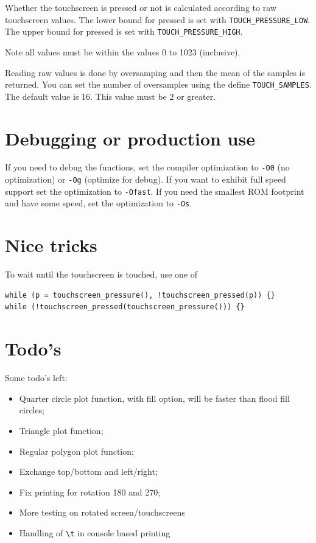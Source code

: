 \documentclass[12pt]{article}
\begin{document}
Whether the touchscreen is pressed or not is calculated according to raw touchscreen values. The lower bound for pressed is set with \lstinline|TOUCH_PRESSURE_LOW|. The upper bound for pressed is set with \lstinline|TOUCH_PRESSURE_HIGH|.

Note all values must be within the values 0 to 1023 (inclusive).

Reading raw values is done by oversamping and then the mean of the samples is returned. You can set the number of oversamples using the define \lstinline|TOUCH_SAMPLES|. The default value is 16. This value must be 2 or greater.

\section{Debugging or production use}
If you need to debug the functions, set the compiler optimization to \lstinline|-O0| (no optimization) or \lstinline|-Og| (optimize for debug). If you want to exhibit full speed support set the optimization to \lstinline|-Ofast|. If you need the smallest ROM footprint and have some speed, set the optimization to \lstinline|-Os|.

\section{Nice tricks}
To wait until the touchscreen is touched, use one of

\begin{lstlisting}
while (p = touchscreen_pressure(), !touchscreen_pressed(p)) {}
while (!touchscreen_pressed(touchscreen_pressure())) {}
\end{lstlisting}




\section{Todo's}
Some todo's left:

\begin{itemize}
\item Quarter circle plot function, with fill option, will be faster than flood fill circles;
\item Triangle plot function;
\item Regular polygon plot function;
\item Exchange top/bottom and left/right;
\item Fix printing for rotation 180 and 270;
\item More testing on rotated screen/touchscreens
\item Handling of \lstinline|\t| in console based printing
\end{itemize}
\end{document}
